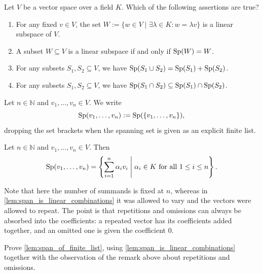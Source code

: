 \begin{exercise}
\label{exc:span_subspaces_mc}
Let $V$ be a vector space over a field $K$. Which of the following assertions are true?
\begin{enumerate}
    \item For any fixed $v \in V$, the set $W := \{w \in V \mid \exists \lambda \in K : w = \lambda v\}$ is a linear subspace of $V$.
    \item A subset $W \subseteq V$ is a linear subspace if and only if $\operatorname{Sp}(W) = W$.
    \item For any subsets $S_1, S_2 \subseteq V$, we have $\operatorname{Sp}(S_1 \cup S_2) = \operatorname{Sp}(S_1) + \operatorname{Sp}(S_2)$.
    \item For any subsets $S_1, S_2 \subseteq V$, we have $\operatorname{Sp}(S_1 \cap S_2) \subseteq \operatorname{Sp}(S_1) \cap \operatorname{Sp}(S_2)$.
\end{enumerate}
\end{exercise}

\begin{notation}
\label{not:span_of_a_list}
Let $n \in \mathbb{N}$ and $v_1, \dots, v_n \in V$. We write
\[
\operatorname{Sp}(v_1, \dots, v_n) := \operatorname{Sp}(\{v_1, \dots, v_n\}),
\]
dropping the set brackets when the spanning set is given as an explicit finite list.
\end{notation}

\begin{lemma}
\label{lem:span_of_finite_list}
Let $n \in \mathbb{N}$ and $v_1, \dots, v_n \in V$. Then
\[
\operatorname{Sp}(v_1, \dots, v_n) = \left\{ \sum_{i=1}^{n} \alpha_i v_i \;\middle|\; \alpha_i \in K \text{ for all } 1 \le i \le n \right\}.
\]
\end{lemma}

\begin{remark}
\label{rem:fixed_number_of_summands}
Note that here the number of summands is fixed at $n$, whereas in \cref{lem:span_is_linear_combinations} it was allowed to vary and the vectors were allowed to repeat. The point is that repetitions and omissions can always be absorbed into the coefficients: a repeated vector has its coefficients added together, and an omitted one is given the coefficient $0$.
\end{remark}

\begin{exercise}
\label{exc:span_of_finite_list}
Prove \cref{lem:span_of_finite_list}, using \cref{lem:span_is_linear_combinations} together with the observation of the remark above about repetitions and omissions.
\end{exercise}

